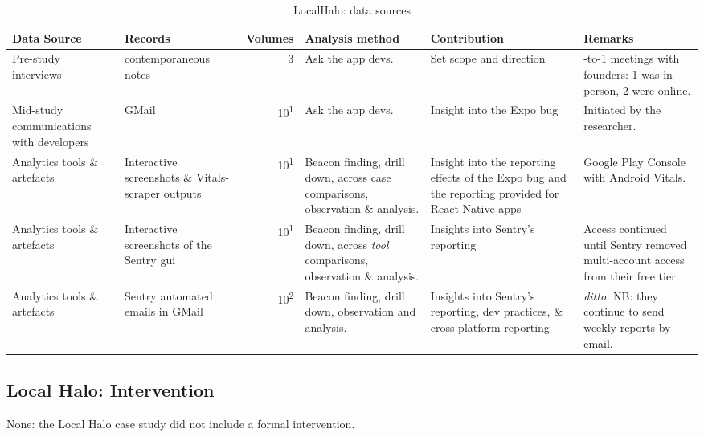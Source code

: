 \begin{table*}
    \centering
    \footnotesize
    \tabcolsep=0.12cm
    \begin{tabular}{p{2.4cm}p{2.4cm}r>{\raggedright}p{2.4cm}>{\raggedright}p{3cm}>{\raggedright\arraybackslash}p{2.5cm}} %
        Data Source & Records & Volumes & Analysis method & Contribution & Remarks \\
        \toprule
         Pre-study interviews & contemporaneous notes\footnotemark & 3 & Ask the app devs. & Set scope and direction & 1-to-1 meetings with founders: 1 was in-person, 2 were online. \\
         Mid-study communications with developers & GMail & 10\textsuperscript{1} & Ask the app devs. & Insight into the Expo bug & Initiated by the researcher. \\
         Analytics tools \& artefacts &Interactive screenshots \& Vitals-scraper outputs &10\textsuperscript{1} & Beacon finding, drill down, across case comparisons, observation \& analysis. & Insight into the reporting effects of the Expo bug and the reporting provided for React-Native apps & Google Play Console with Android Vitals. \\
         Analytics tools \& artefacts & Interactive screenshots of the Sentry \acrshort{gui} & 10\textsuperscript{1} & Beacon finding, drill down, across \textit{tool} comparisons\footnotemark, observation \& analysis. & Insights into Sentry's reporting & Access continued until Sentry removed multi-account access from their free tier. \\
         Analytics tools \& artefacts & Sentry automated emails in GMail & 10\textsuperscript{2} & Beacon finding, drill down, observation and analysis. & Insights into Sentry's reporting, dev practices, \& cross-platform reporting & \textit{ditto.} NB: they continue to send weekly reports by email. \\
         \bottomrule
    \end{tabular}
    \caption{LocalHalo: data sources}
    \label{tab:localhalo-data-sources}
\end{table*}


\subsection{Local Halo: Intervention}
None: the Local Halo case study did not include a formal intervention.

